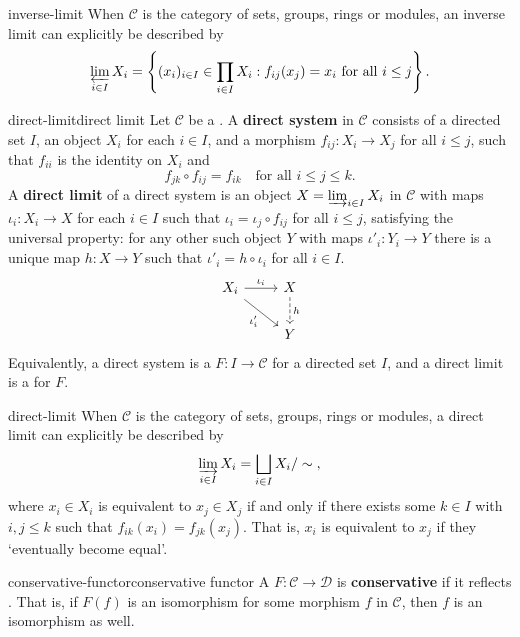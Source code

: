 \begin{example}{inverse-limit}
    When $\mathcal{C}$ is the category of sets, groups, rings or modules, an inverse limit can explicitly be described by
    \[ \varprojlim_{i \in I} X_i = \left\{ (x_i)_{i \in I} \in \prod_{i \in I} X_i : f_{ij}(x_j) = x_i \text{ for all } i \le j \right\} . \]
\end{example}

\begin{topic}{direct-limit}{direct limit}
    Let $\mathcal{C}$ be a . A \textbf{direct system} in $\mathcal{C}$ consists of a directed set $I$, an object $X_i$ for each $i \in I$, and a morphism $f_{ij} \colon X_i \to X_j$ for all $i \le j$, such that $f_{ii}$ is the identity on $X_i$ and
    \[ f_{jk} \circ f_{ij} = f_{ik} \quad \text{for all } i \le j \le k . \]
    A \textbf{direct limit} of a direct system is an object $X = \varinjlim_{i \in I} X_i$ in $\mathcal{C}$ with maps $\iota_i \colon X_i \to X$ for each $i \in I$ such that $\iota_i = \iota_j \circ f_{ij}$ for all $i \le j$, satisfying the universal property: for any other such object $Y$ with maps $\iota'_i \colon Y_i \to Y$ there is a unique map $h \colon X \to Y$ such that $\iota'_i = h \circ \iota_i$ for all $i \in I$.
    \[ \svg \begin{tikzcd} X_i \arrow{r}{\iota_i} \arrow[swap]{dr}{\iota'_i} & X \arrow[dashed]{d}{h} \\ & Y \end{tikzcd} \]
    Equivalently, a direct system is a  $F \colon I \to \mathcal{C}$ for a directed set $I$, and a direct limit is a  for $F$.
\end{topic}

\begin{example}{direct-limit}
    When $\mathcal{C}$ is the category of sets, groups, rings or modules, a direct limit can     explicitly be described by
    \[ \varinjlim_{i \in I} X_i = \bigsqcup_{i \in I} X_i / \sim{} , \]
    where $x_i \in X_i$ is equivalent to $x_j \in X_j$ if and only if there exists some $k \in I$ with $i, j \le k$ such that $f_{ik}(x_i) = f_{jk}(x_j)$. That is, $x_i$ is equivalent to $x_j$ if they `eventually become equal'.
\end{example}

\begin{topic}{conservative-functor}{conservative functor}
    A  $F \colon \mathcal{C} \to \mathcal{D}$ is \textbf{conservative} if it reflects . That is, if $F(f)$ is an isomorphism for some morphism $f$ in $\mathcal{C}$, then $f$ is an isomorphism as well.
\end{topic}

